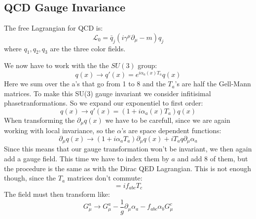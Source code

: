 \documentclass[a4,10pt,titlepage]{article}
\renewcommand\[{\begin{equation*}}
\renewcommand\]{\end{equation*}}
\newcommand{\be}{\begin{equation}}
\newcommand{\ee}{\end{equation}}
\numberwithin{equation}{section}
\newcommand{\lp}{\left}
\newcommand{\rp}{\right}
\newcommand{\Lar}{\mathscr{L}}
\begin{document}
\subsection{QCD Gauge Invariance}
The free Lagrangian for QCD is:
\be
\Lar_0=\bar q_j\lp( i\gamma^\mu\partial_\mu-m \rp)q_j
\ee
where $q_1,q_2,q_3$ are the three color fields.

We now have to work with the the $SU(3)$ group:
\be
q(x)\rightarrow q'(x)= e^{i\alpha_a(x) T_a}q(x)
\ee
Here we sum over the a's that go from 1 to 8 and the $T_a$'s are half the Gell-Mann matrices. To make this SU(3) gauge invariant we consider infitisimal phasetranformations. So we expand our exponentiel to first order:
\[
q(x)\rightarrow q'(x)= \lp(1+i\alpha_a(x)T_a\rp)q(x)
\]
When transforming the $\partial_\mu q(x)$ we have to be carefull, since we are again working with local invariance, so the $\alpha$'s are space dependent functions:
\[
\partial_\mu q(x)\rightarrow\lp(1+i\alpha_a T_a\rp)\partial_\mu q(x)+iT_aq\partial_\mu\alpha_a
\]
Since this means that our gauge transformation won't be invariant, we then again add a gauge field. This time we have to index them by $a$ and add 8 of them, but the procedure is the same as with the Dirac QED Lagrangian. This is not enough though, since the $T_a$ matrices don't commute:
\[
[T_a,T_b]=if_{abc}T_c
\]
The field must then transform like:
\[
G_\mu^a \rightarrow G_\mu^a-\frac{1}{g}\partial_\mu\alpha_a-f_{abc}\alpha_bG_\mu^c
\]
\end{document}
